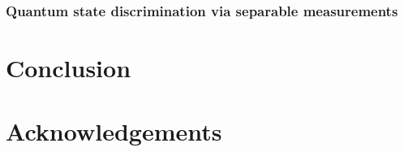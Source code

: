 \documentclass[nofootinbib,superscriptaddress,a4paper,twocolumn,longbibliography,floatfix,pra]{revtex4-2}
\begin{document}
\subsubsection{Quantum state discrimination via separable measurements}
\label{sec:}


\section{Conclusion}


\section{Acknowledgements}


\clearpage
\end{document}
